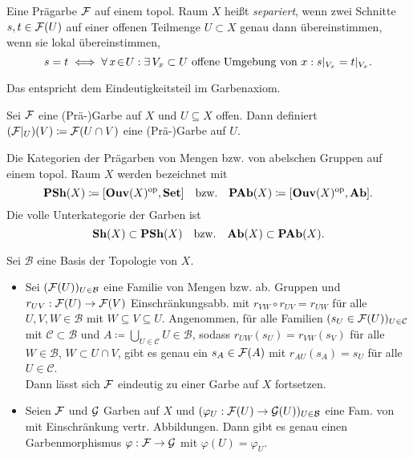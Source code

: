 \documentclass{cheat-sheet}
\begin{document}
\begin{defn}
  Eine Prägarbe $\mathcal{F}$ auf einem topol. Raum $X$ heißt \emph{separiert}, wenn zwei Schnitte $s, t \in \mathcal{F}(U)$ auf einer offenen Teilmenge $U \subset X$ genau dann übereinstimmen, wenn sie lokal übereinstimmen, \dh{}
  \[ s = t \iff \forall \, {x \!\in\! U\!} \,:\,\! \exists \, {V_x \subset U \text{ offene Umgebung von $x$}\!} \,:\,\! s|_{V_x} = t|_{V_x}. \]
\end{defn}

\begin{bem}
  Das entspricht dem Eindeutigkeitsteil im Garbenaxiom.
\end{bem}

\begin{bem}
  Sei $\mathcal{F}$ eine (Prä-)Garbe auf $X$ und $U \subseteq X$ offen. Dann definiert $(\mathcal{F}|_U)(V) \coloneqq \mathcal{F}(U \cap V)$ eine (Prä-)Garbe auf $U$.
\end{bem}

\begin{nota}
  Die Kategorien der Prägarben von Mengen bzw. von abelschen Gruppen auf einem topol. Raum $X$ werden bezeichnet mit
  \[
    \mathbf{PSh}(X) \coloneqq [\mathbf{Ouv}(X)^{\mathrm{op}}, \mathbf{Set}]
    \quad \text{bzw.} \quad
    \mathbf{PAb}(X) \coloneqq [\mathbf{Ouv}(X)^{\mathrm{op}}, \mathbf{Ab}].
  \]
  Die volle Unterkategorie der Garben ist
  \[
    \mathbf{Sh}(X) \subset \mathbf{PSh}(X)
    \quad \text{bzw.} \quad
    \mathbf{Ab}(X) \subset \mathbf{PAb}(X).
  \]
\end{nota}

\begin{lem}
  Sei $\mathcal{B}$ eine Basis der Topologie von $X$.
  \begin{itemize}
    \item Sei $(\mathcal{F}(U))_{U \in \mathcal{B}}$ eine Familie von Mengen bzw. ab. Gruppen und $r_{UV} : \mathcal{F}(U) \to \mathcal{F}(V)$ Einschränkungsabb. mit $r_{VW} \circ r_{UV} = r_{UW}$ für alle $U, V, W \in \mathcal{B}$ mit $W \subseteq V \subseteq U$.
    Angenommen, für alle Familien $(s_U \in \mathcal{F}(U))_{U \in \mathcal{C}}$ mit $\mathcal{C} \subset \mathcal{B}$ und $A \coloneqq {\bigcup}_{U \in \mathcal{C}} U \in \mathcal{B}$, sodass $r_{UW}(s_U) = r_{VW}(s_V)$ für alle $W \in \mathcal{B}$, $W \subset U \cap V$, gibt es genau ein $s_A \in \mathcal{F}(A)$ mit $r_{AU}(s_A) = s_U$ für alle $U \in \mathcal{C}$. \\
    Dann lässt sich $\mathcal{F}$ eindeutig zu einer Garbe auf $X$ fortsetzen.
    \item Seien $\mathcal{F}$ und $\mathcal{G}$ Garben auf $X$ und $(\varphi_U : \mathcal{F}(U) \to \mathcal{G}(U))_{U \in \mathcal{B}}$ eine Fam. von mit Einschränkung vertr. Abbildungen. Dann gibt es genau einen Garbenmorphismus $\varphi : \mathcal{F} \to \mathcal{G}$ mit $\varphi(U) = \varphi_U$.
  \end{itemize}
\end{lem}
\end{document}
